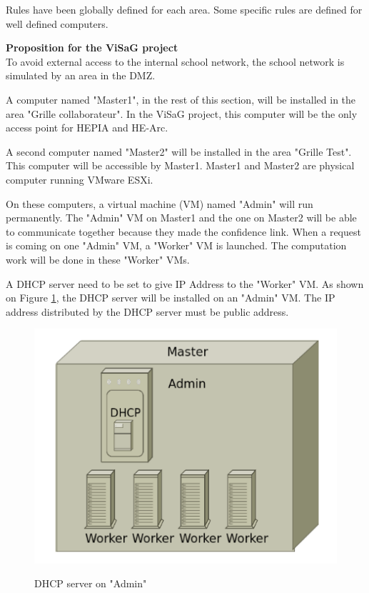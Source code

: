 Rules have been globally defined for each area. Some specific rules are defined for well defined computers. 

\textbf{Proposition for the ViSaG project}\\
To avoid external access to the internal school network, the school network is simulated by an area in the DMZ. \s

A computer named "Master1", in the rest of this section, will be installed in the area "Grille collaborateur". In the ViSaG project, this computer will be the only access point for HEPIA and HE-Arc. \s

A second computer named "Master2" will be installed in the area "Grille Test". This computer will be accessible by Master1. Master1 and Master2 are physical computer running VMware ESXi.\s

On these computers, a virtual machine (VM) named "Admin" will run permanently. The "Admin" VM on Master1 and the one on Master2 will be able to communicate together because they made the confidence link.
When a request is coming on one "Admin" VM, a "Worker" VM is launched. The computation work will be done in these "Worker" VMs.\s

\pagebreak
A DHCP server need to be set to give IP Address to the "Worker" VM. As shown on Figure \ref{fig:dmz_dhcp1}, the DHCP server will be installed on an "Admin" VM. The IP address distributed by the DHCP server must be public address.

\begin{figure}[ht]
	\caption{DHCP server on "Admin"}
  	\centering
	\includegraphics[scale=0.6]{./pic/dmz2.png}
	\label{fig:dmz_dhcp1}
\end{figure}

